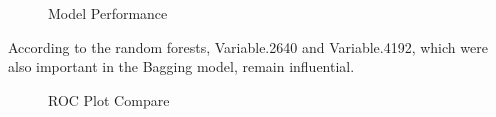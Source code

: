 \documentclass[
  12pt,
  letterpaper,
  DIV=11,
  numbers=noendperiod]{scrartcl}
\begin{document}
\begin{figure}


\caption{\label{fig-tree8}Model Performance}

\end{figure}%

According to the random forests, Variable.2640 and Variable.4192, which
were also important in the Bagging model, remain influential.

\begin{figure}


\caption{\label{fig-tree10}ROC Plot Compare}

\end{figure}%
\end{document}
